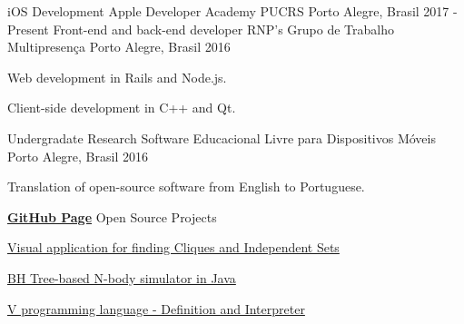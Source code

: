 \begin{cventries}
  \cventry
    {iOS Development}
    {Apple Developer Academy PUCRS}
    {Porto Alegre, Brasil}
    {2017 - Present}
    {}
  \cventry
    {Front-end and back-end developer}
    {RNP's Grupo de Trabalho Multipresença}
    {Porto Alegre, Brasil}
    {2016}
    {
      \begin{cvitems}
        \item {Web development in Rails and Node.js.}
        \item {Client-side development in C++ and Qt.}
      \end{cvitems}
    }
  \cventry
    {Undergradate Research}
    {Software Educacional Livre para Dispositivos Móveis}
    {Porto Alegre, Brasil}
    {2016}
    {
      \begin{cvitems}
        \item {Translation of open-source software from English to Portuguese.}
      \end{cvitems}
    }
  \cventry
    {\href{https://github.com/AvatarHurden/}{\textbf{GitHub Page}}}
    {Open Source Projects}
    {}
    {}
    {
      \begin{cvitems}
        \item {\href{https://github.com/AvatarHurden/Clique-and-Ind.Set-Calculator}{Visual application for finding Cliques and Independent Sets}}
        \item {\href{https://github.com/AvatarHurden/Simulador-Galaxias}{BH Tree-based N-body simulator in Java}}
        \item {\href{https://github.com/AvatarHurden/V}{V programming language - Definition and Interpreter}}
      \end{cvitems}
    }
\end{cventries}
